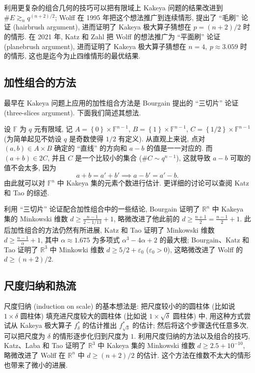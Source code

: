 \documentclass[a4paper]{article}
\numberwithin{equation}{section}
\numberwithin{figure}{section}
\numberwithin{table}{section}
\theoremstyle{definition}
\newcommand{\set}[1]{\left\{ #1 \right\}}
\renewcommand{\geq}{\geqslant}
\newcommand{\gs}{\gtrsim}
\newcommand{\R}{\mathbb{R}}
\newcommand{\F}{\mathbb{F}}
\newcommand{\e}{\varepsilon}
\begin{document}
利用更复杂的组合几何的技巧可以把有限域上 Kakeya 问题的结果改进到 $\# E\gs_n q^{(n+2)/2}$; Wolff 在 1995 年把这个想法推广到连续情形, 提出了 ``毛刷'' 论证 (hairbrush argument), 进而证明了 Kakeya 极大算子猜想在 $p=(n+2)/2$ 时的情形.\cite{wolff1995improved} 在 2021 年, Katz 和 Zahl 把 Wolff 的想法推广为 ``平面刷'' 论证 (planebrush argument), 进而证明了 Kakeya 极大算子猜想在 $n=4,\ p\approx 3.059$ 时的情形\cite{katz2020kakeya}, 这也是迄今为止四维情形的最优结果. 

\subsection{加性组合的方法}

最早在 Kakeya 问题上应用的加性组合方法是 Bourgain 提出的 ``三切片'' 论证 (three-slices argument)\cite{bourgain1999dimension}. 下面我们简述其想法. 

设 $\F$ 为 $q$ 元有限域, 记 $A=\set{0}\times\F^{n-1}$, $B=\set{1}\times\F^{n-1}$, $C=\set{1/2}\times\F^{n-1}$ (为简单起见不妨设 $q$ 是奇数使得 $1/2$ 有定义). 从直观上来说, 点对 $(a, b)\in A\times B$ 确定的 ``直线'' 的方向和 $a-b$ 的值是一一对应的. 而 $(a+b)\in 2C$, 并且 $C$ 是一个比较小的集合 ($\# C\sim q^{n-1}$), 这就导致 $a-b$ 可取的值不会太多, 因为
\[
    a + b = a' + b' \implies a - b' = a' - b.
\]
由此就可以对 $\F^n$ 中 Kakeya 集的元素个数进行估计. 更详细的讨论可以查阅 Katz 和 Tao 的综述\cite{katz2002recent}.

利用 ``三切片'' 论证配合加性组合中的一些结论, Bourgain 证明了 $\R^n$ 中 Kakeya 集的 Minkowski 维数 $d\geq \frac{n-1}{2-1/13} + 1$\cite{bourgain1999dimension}, 略微改进了他此前的 $d\geq \frac{n+1}{2} = \frac{n-1}{2} + 1$. 此后加性组合的方法仍然有所进展, Katz 和 Tao 证明了 Minkowski 维数 $d\geq \frac{n-1}{\alpha} + 1$, 其中 $\alpha\approx 1.675$ 为多项式 $\alpha^3-4\alpha + 2$ 的最大根\cite{katz2001new}; Bourgain、Katz 和 Tao 证明了 $\R^3$ 中 Minkowki 维数 $d\geq 5/2+\e_0$ ($\e_0>0$),\cite{bourgain2004sum} 这略微改进了 Wolff 的 $d\geq (n+2)/2$. 

\subsection{尺度归纳和热流}

尺度归纳 (induction on scale) 的基本想法是: 把尺度较小的的圆柱体 (比如说 $1\times\delta$ 圆柱体) 填充进尺度较大的圆柱体 (比如说 $1\times\sqrt{\delta}$ 圆柱体) 中, 用这种方式尝试从 Kakeya 极大算子 $f_\delta^*$ 的估计推出 $f_{\sqrt{\delta}}^*$ 的估计; 然后将这个步骤迭代任意多次, 可以把尺度为 $\delta$ 的情形逐步化归到尺度为 $1$. 利用尺度归纳的方法以及组合的技巧, Katz、Laba 和 Tao 证明了 $\R^3$ 中 Kakeya 集的 Minkowski 维数 $d\geq 2.5+10^{-10}$,\cite{katz2000improved} 略微改进了 Wolff 在 $\R^n$ 中 $d\geq (n+2)/2$ 的估计. 这个方法在维数不太大的情形也带来了微小的进展.\cite{laba2001improved}
\end{document}
